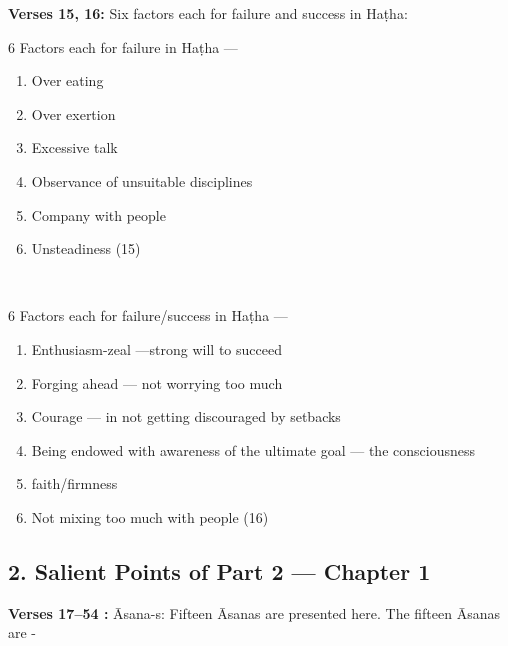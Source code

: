 \textbf{Verses 15, 16:} Six factors each for failure and success in Haṭha: 

\noindent
\begin{minipage}[t]{.45\linewidth}
6 Factors each for failure in Haṭha ---
\begin{enumerate}
\item Over eating 
\item Over exertion 
\item Excessive talk
\item Observance of unsuitable disciplines 
\item Company with people 
\item Unsteadiness  (15)
\end{enumerate}
\end{minipage}
\smallskip~
\begin{minipage}[t]{.45\linewidth}
6 Factors each for failure/success in Haṭha ---
\begin{enumerate}
\item Enthusiasm-zeal ---\hfil\break  strong will to succeed 
\item Forging ahead --- not worrying too much 
\item Courage --- in not getting discouraged by setbacks
\item Being  endowed with awareness of the ultimate goal --- the consciousness  
\item faith/firmness 
\item Not mixing too much with people (16) 
\end{enumerate}
\end{minipage}

\subsection*{2. Salient Points of Part 2 --- Chapter 1}

\textbf{Verses  17--54 :} Āsana-s: Fifteen Āsanas are presented here. The fifteen Āsanas are - 

